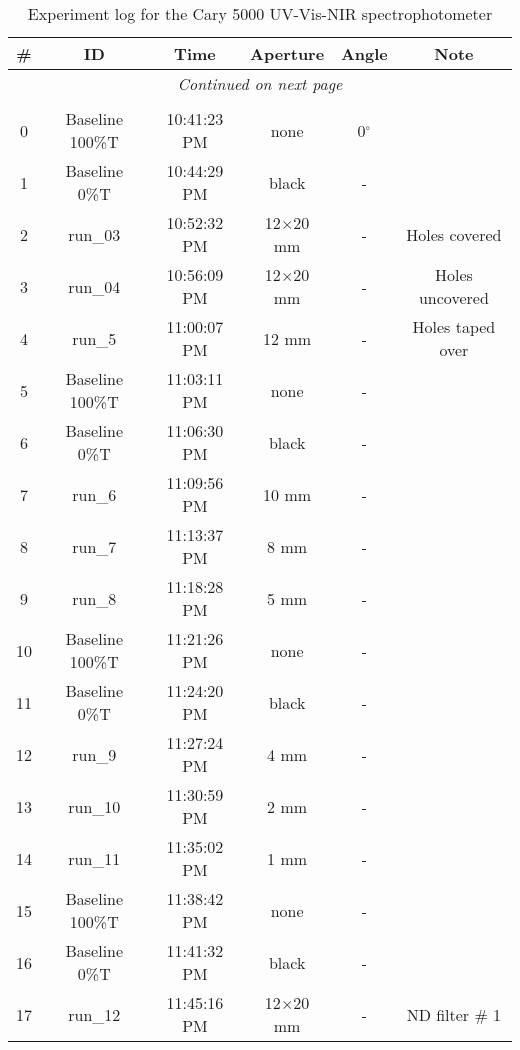 \begin{center}
    \begin{longtable}{c c c c c  c}
    \caption[Cary 5000 run \#4 and \#5]{Experiment log for the Cary 5000 UV-Vis-NIR spectrophotometer} \label{CaryRun4-5} \\

    \hline
     \# & ID & Time & Aperture & Angle & Note\\ 
    \hline
     \endhead

\hline \multicolumn{6}{c}{{\emph{Continued on next page}}} \\ \hline
\endfoot

\hline \hline
\endlastfoot

        \hline
       \multicolumn{6}{c}{Run \#4-- May 2, 2013} \\
         \hline
       0 & Baseline 100\%T &  10:41:23 PM  & none & 0$^{\circ}$ & \\
       1 & Baseline 0\%T &   10:44:29 PM  & black & - & \\
       2 & run\_03 &   10:52:32 PM  &12$\times$20 mm & - & Holes covered\\
       3 & run\_04 &   10:56:09 PM  &12$\times$20 mm & - & Holes uncovered\\
       4 & run\_5 &   11:00:07 PM  & 12 mm & - & Holes taped over\\
       5 & Baseline 100\%T &   11:03:11 PM  & none & - & \\
       6 & Baseline 0\%T &   11:06:30 PM  & black & - &  \\
       7 & run\_6 &   11:09:56 PM  & 10 mm & - & \\
       8 & run\_7 &   11:13:37 PM  & 8 mm & - & \\
       9 & run\_8 &   11:18:28 PM  & 5 mm & - & \\
      10 & Baseline 100\%T &   11:21:26 PM  & none & - & \\
      11 & Baseline 0\%T &   11:24:20 PM  & black & - & \\
      12 & run\_9 &   11:27:24 PM  & 4 mm & - & \\
      13 & run\_10 &   11:30:59 PM  & 2 mm & - & \\
      14 & run\_11 &   11:35:02 PM  & 1 mm & - & \\
      15 & Baseline 100\%T &   11:38:42 PM  & none & - & \\
      16 & Baseline 0\%T &   11:41:32 PM  & black & - & \\
      17 & run\_12 &   11:45:16 PM  & 12$\times$20 mm & - & ND filter \# 1\\

\end{longtable}
\end{center}
